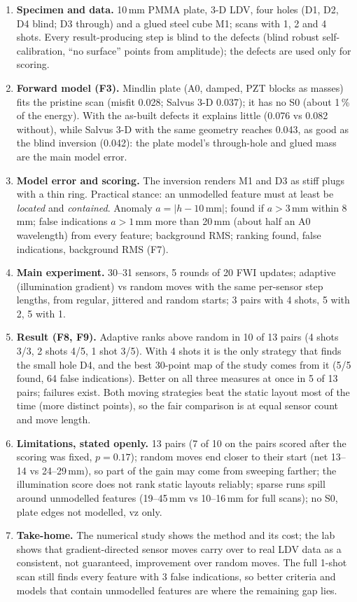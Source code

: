 \documentclass[10pt]{article}
\begin{document}
\begin{enumerate}[resume]
\item \textbf{Specimen and data.} 10\,mm PMMA plate, 3-D LDV, four holes (D1, D2, D4 blind; D3 through) and a glued steel cube M1; scans with 1, 2 and 4 shots. Every result-producing step is blind to the defects (blind robust self-calibration, ``no surface'' points from amplitude); the defects are used only for scoring.
\item \textbf{Forward model (F3).} Mindlin plate (A0, damped, PZT blocks as masses) fits the pristine scan (misfit 0.028; Salvus 3-D 0.037); it has no S0 (about 1\,\% of the energy). With the as-built defects it explains little (0.076 vs 0.082 without), while Salvus 3-D with the same geometry reaches 0.043, as good as the blind inversion (0.042): the plate model's through-hole and glued mass are the main model error.
\item \textbf{Model error and scoring.} The inversion renders M1 and D3 as stiff plugs with a thin ring. Practical stance: an unmodelled feature must at least be \emph{located} and \emph{contained}. Anomaly $a=|h-10\,\mathrm{mm}|$; found if $a>3$\,mm within 8\,mm; false indications $a>1$\,mm more than 20\,mm (about half an A0 wavelength) from every feature; background RMS; ranking found, false indications, background RMS (F7).
\item \textbf{Main experiment.} 30--31 sensors, 5 rounds of 20 FWI updates; adaptive (illumination gradient) vs random moves with the same per-sensor step lengths, from regular, jittered and random starts; 3 pairs with 4 shots, 5 with 2, 5 with 1.
\item \textbf{Result (F8, F9).} Adaptive ranks above random in 10 of 13 pairs (4 shots 3/3, 2 shots 4/5, 1 shot 3/5). With 4 shots it is the only strategy that finds the small hole D4, and the best 30-point map of the study comes from it (5/5 found, 64 false indications). Better on all three measures at once in 5 of 13 pairs; failures exist. Both moving strategies beat the static layout most of the time (more distinct points), so the fair comparison is at equal sensor count and move length.
\item \textbf{Limitations, stated openly.} 13 pairs (7 of 10 on the pairs scored after the scoring was fixed, $p=0.17$); random moves end closer to their start (net 13--14 vs 24--29\,mm), so part of the gain may come from sweeping farther; the illumination score does not rank static layouts reliably; sparse runs spill around unmodelled features (19--45\,mm vs 10--16\,mm for full scans); no S0, plate edges not modelled, vz only.
\item \textbf{Take-home.} The numerical study shows the method and its cost; the lab shows that gradient-directed sensor moves carry over to real LDV data as a consistent, not guaranteed, improvement over random moves. The full 1-shot scan still finds every feature with 3 false indications, so better criteria and models that contain unmodelled features are where the remaining gap lies.
\end{enumerate}
\end{document}

